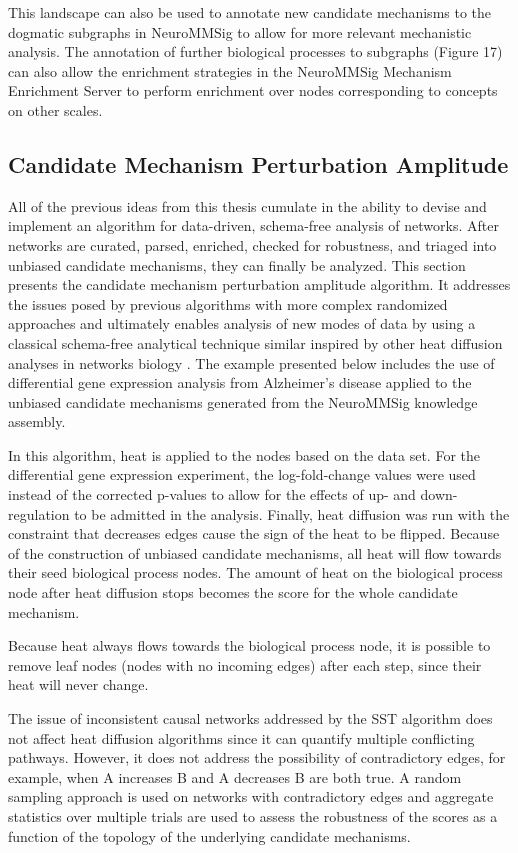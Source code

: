 This landscape can also be used to annotate new candidate mechanisms to the dogmatic subgraphs in \ac{NeuroMMSig} to allow for more relevant mechanistic analysis. The annotation of further biological processes to subgraphs (Figure 17) can also allow the enrichment strategies in the \ac{NeuroMMSig} Mechanism Enrichment Server to perform enrichment over nodes corresponding to concepts on other scales.

\subsection{Candidate Mechanism Perturbation Amplitude}

All of the previous ideas from this thesis cumulate in the ability to devise and implement an algorithm for data-driven, schema-free analysis of networks. After networks are curated, parsed, enriched, checked for robustness, and triaged into unbiased candidate mechanisms, they can finally be analyzed. This section presents the candidate mechanism perturbation amplitude algorithm. It addresses the issues posed by previous algorithms with more complex randomized approaches and ultimately enables analysis of new modes of data by using a classical schema-free analytical technique similar inspired by other heat diffusion analyses in networks biology \cite{Bernabo2014,Leiserson2015}. The example presented below includes the use of differential gene expression analysis from Alzheimer's disease applied to the unbiased candidate mechanisms generated from the \ac{NeuroMMSig} knowledge assembly.

In this algorithm, heat is applied to the nodes based on the data set. For the differential gene expression experiment, the log-fold-change values were used instead of the corrected p-values to allow for the effects of up- and down-regulation to be admitted in the analysis. Finally, heat diffusion was run with the constraint that decreases edges cause the sign of the heat to be flipped. Because of the construction of unbiased candidate mechanisms, all heat will flow towards their seed biological process nodes. The amount of heat on the biological process node after heat diffusion stops becomes the score for the whole candidate mechanism.

Because heat always flows towards the biological process node, it is possible to remove leaf nodes (nodes with no incoming edges) after each step, since their heat will never change. 

The issue of inconsistent causal networks addressed by the SST algorithm does not affect heat diffusion algorithms since it can quantify multiple conflicting pathways. However, it does not address the possibility of contradictory edges, for example, when A increases B and A decreases B are both true. A random sampling approach is used on networks with contradictory edges and aggregate statistics over multiple trials are used to assess the robustness of the scores as a function of the topology of the underlying candidate mechanisms.

